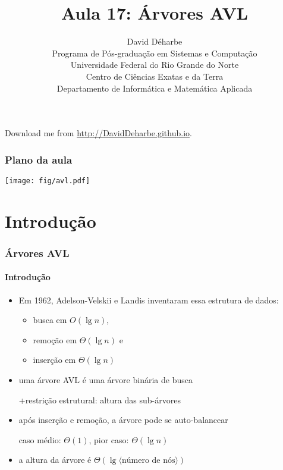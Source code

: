 \documentclass{beamer}
\title{Aula 17: Árvores AVL}
\author{David Déharbe \\
  Programa de Pós-graduação em Sistemas e Computação \\
  Universidade Federal do Rio Grande do Norte \\
  Centro de Ciências Exatas e da Terra \\
  Departamento de Informática e Matemática Aplicada}
\date{}
\begin{document}
\begin{frame}
  \titlepage
  Download me from \url{http://DavidDeharbe.github.io}.
\end{frame}

\begin{frame}
  \frametitle{Plano da aula}


  \begin{center}
    \texttt{[image: fig/avl.pdf]}
  \end{center}

  \tableofcontents

\end{frame}

\section{Introdução}

\begin{frame}

  \frametitle{Árvores AVL}
  \framesubtitle{Introdução}

  
  \begin{itemize}
    
  \item Em 1962, Adelson-Velskii e Landis inventaram essa estrutura de dados:
    \begin{itemize}
    \item busca em $O(\lg n)$, 
    \item remoção em $\Theta(\lg n)$ e
    \item inserção em $\Theta(\lg n)$
    \end{itemize}

  \item uma \alert{árvore AVL} é uma árvore binária de busca 

  +restrição estrutural: altura das sub-árvores

  \item após inserção e remoção, a árvore pode se auto-balancear 

    caso médio: $\Theta(1)$, pior caso: $\Theta(\lg n)$
    
  \item a altura da árvore é $\Theta(\lg \langle \text{número de nós} \rangle)$

  \end{itemize}

\end{frame}
\end{document}
